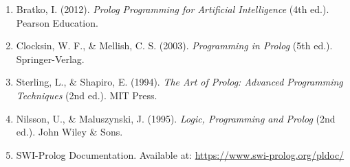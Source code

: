 \documentclass[12pt,a4paper]{article}
\begin{document}
\begin{enumerate}
    \item Bratko, I. (2012). \textit{Prolog Programming for Artificial Intelligence} (4th ed.). Pearson Education.
    \item Clocksin, W. F., \& Mellish, C. S. (2003). \textit{Programming in Prolog} (5th ed.). Springer-Verlag.
    \item Sterling, L., \& Shapiro, E. (1994). \textit{The Art of Prolog: Advanced Programming Techniques} (2nd ed.). MIT Press.
    \item Nilsson, U., \& Maluszynski, J. (1995). \textit{Logic, Programming and Prolog} (2nd ed.). John Wiley \& Sons.
    \item SWI-Prolog Documentation. Available at: \url{https://www.swi-prolog.org/pldoc/}
\end{enumerate}
\end{document}
